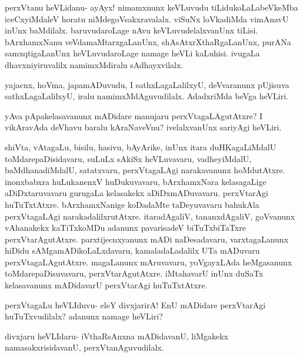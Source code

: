 \documentclass{article}
\begin{document}
\begin{mng}%
perxVtanu heVLidanu- ayAyx! nimamxnunx keVLuvudu tiLidukoLaLabeVkeMba 
iceCxyiMdaleV horatu niMdegoVsakxravalalx. viSuNx loVkadiMda vimAnavU 
inUnx baMdilalx. baruvudaroLage nAvu keVLuvudelalxvanUnx tiLisi. 
bArxhamxNanu veVdamaMtarxgaLanUnx, shAsAtxrXthaRgaLanUnx, purANa 
samxqtigaLanUnx heVLuvudaroLage namage heVLi kaLuhisi. ivugaLa 
dhavxniyiruvalilx namimxMdiralu sAdhayxvilalx.
\end{mng}

\begin{mng}%
yajacnx, hoVma, japamADuvudu, I sathxLagaLalilxyU, deVvaranunx 
pUjisuva sathxLagaLalilxyU, iralu namimxMdAguvudilalx. AdadxriMda 
beVga heVLiri.
\end{mng}

\begin{mng}%
yAva pApakelasavanunx mADidare manujaru perxVtagaLAgutAtxre? I 
vikAravAda deVhavu baralu kAraNaveVnu? ivelalxvanUnx sariyAgi heVLiri.
\end{mng}

\begin{mng}%
shiVta, vAtagaLu, bisilu, hasivu, bAyArike, inUnx itara duHKagaLiMdalU 
toMdarepaDisidavaru, suLuLx sAkiSx heVLuvavaru, vadheyiMdalU, 
baMdhanadiMdalU, satatxvaru, perxVtagaLAgi narakavanunx hoMdutAtxre. 
inonxbabxra huLukanenxV huDukuvavaru, bArxhamxNara kelasagaLige 
aDiDxtaruvavaru gurugaLa kelasakekx aDiDxmADuvavaru. perxVtarAgi 
huTuTxtAtxre. bArxhamxNanige koDadaMte taDeyuvavaru bahukAla 
perxVtagaLAgi narakadalilxrutAtxre. itaradAgaliV, tananxdAgaliV, 
goVvanunx vAhanakekx kaTiTxkoMDu adanunx pavarisadeV biTuTxbiTaTxre 
perxVtarAgutAtxre. parxtijecnxyanunx mADi naDesadavaru, varxtagaLanunx 
hiDidu sAMgamADikoLaLxdavaru, kamaladaLadalilx UTa mADuvaru 
perxVtagaLAgutAtxre. magaLanunx mAruvavaru, yoVgayxLAda heMgasanunx 
toMdarepaDisuvavaru, perxVtarAgutAtxre. iMtahavarU inUnx duSaTx 
kelasavanunx mADidavarU perxVtarAgi huTuTxtAtxre.
\end{mng}

\begin{mng}%
perxVtagaLu heVLIduvu- eleY divxjarirA! EnU mADidare perxVtarAgi 
huTuTxvudilalx? adanunx namage heVLiri?
\end{mng}

\begin{mng}%
divxjaru heVLIdaru- iVthaRsAnxna mADidavanU, liMgakekx 
namasakxrisidavanU, perxVtanAguvudilalx.
\end{mng}
\end{document}
